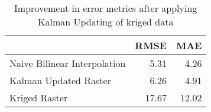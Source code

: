 \begin{table}
\centering
\caption{Improvement in error metrics after applying Kalman Updating of kriged data}
\label{tab:oahu6_gebco_raster_error}
\begin{tabular}{lrr}
\toprule
 & RMSE & MAE \\
\midrule
Naive Bilinear Interpolation & 5.31 & 4.26 \\
Kalman Updated Raster & 6.26 & 4.91 \\
Kriged Raster & 17.67 & 12.02 \\
\bottomrule
\end{tabular}
\end{table}
